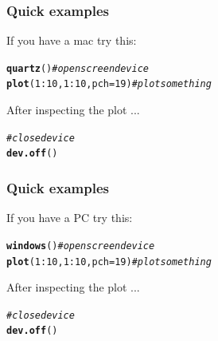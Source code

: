 \documentclass[12pt]{beamer}\usepackage[]{graphicx}\usepackage[]{color}
\makeatletter
\newcommand{\hlnum}[1]{\textcolor[rgb]{0.686,0.059,0.569}{#1}}%
\newcommand{\hlcom}[1]{\textcolor[rgb]{0.678,0.584,0.686}{\textit{#1}}}%
\newcommand{\hlopt}[1]{\textcolor[rgb]{0,0,0}{#1}}%
\newcommand{\hlstd}[1]{\textcolor[rgb]{0.345,0.345,0.345}{#1}}%
\newcommand{\hlkwc}[1]{\textcolor[rgb]{0.333,0.667,0.333}{#1}}%
\newcommand{\hlkwd}[1]{\textcolor[rgb]{0.737,0.353,0.396}{\textbf{#1}}}%
\newenvironment{kframe}{%
 \def\at@end@of@kframe{}%
 \ifinner\ifhmode%
  \def\at@end@of@kframe{\end{minipage}}%
  \begin{minipage}{\columnwidth}%
 \fi\fi%
 \def\FrameCommand##1{\hskip\@totalleftmargin \hskip-\fboxsep
 \colorbox{shadecolor}{##1}\hskip-\fboxsep
     \hskip-\linewidth \hskip-\@totalleftmargin \hskip\columnwidth}%
 \MakeFramed {\advance\hsize-\width
   \@totalleftmargin\z@ \linewidth\hsize
   \@setminipage}}%
 {\par\unskip\endMakeFramed%
 \at@end@of@kframe}
\newenvironment{knitrout}{}{} %
\makeatother
\begin{document}
\begin{frame}[fragile]
\frametitle{Quick examples}

If you have a mac try this:
\begin{knitrout}\footnotesize
{}\color{fgcolor}\begin{kframe}
\begin{alltt}
\hlkwd{quartz}\hlstd{()}   \hlcom{# open screen device}
\hlkwd{plot}\hlstd{(}\hlnum{1}\hlopt{:}\hlnum{10}\hlstd{,} \hlnum{1}\hlopt{:}\hlnum{10}\hlstd{,} \hlkwc{pch} \hlstd{=} \hlnum{19}\hlstd{)}  \hlcom{# plot something}
\end{alltt}
\end{kframe}
\end{knitrout}

\bigskip
After inspecting the plot ...
\begin{knitrout}\footnotesize
{}\color{fgcolor}\begin{kframe}
\begin{alltt}
\hlcom{# close device}
\hlkwd{dev.off}\hlstd{()}
\end{alltt}
\end{kframe}
\end{knitrout}

\end{frame}


\begin{frame}[fragile]
\frametitle{Quick examples}

If you have a PC try this:
\begin{knitrout}\footnotesize
{}\color{fgcolor}\begin{kframe}
\begin{alltt}
\hlkwd{windows}\hlstd{()}  \hlcom{# open screen device}
\hlkwd{plot}\hlstd{(}\hlnum{1}\hlopt{:}\hlnum{10}\hlstd{,} \hlnum{1}\hlopt{:}\hlnum{10}\hlstd{,} \hlkwc{pch} \hlstd{=} \hlnum{19}\hlstd{)}  \hlcom{# plot something}
\end{alltt}
\end{kframe}
\end{knitrout}

\bigskip
After inspecting the plot ...
\begin{knitrout}\footnotesize
{}\color{fgcolor}\begin{kframe}
\begin{alltt}
\hlcom{# close device}
\hlkwd{dev.off}\hlstd{()}
\end{alltt}
\end{kframe}
\end{knitrout}

\end{frame}
\end{document}
